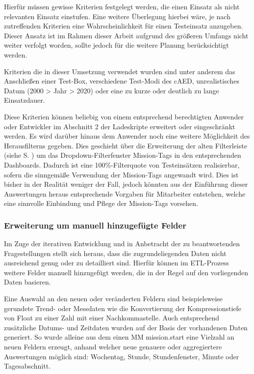 Hierfür müssen gewisse Kriterien festgelegt werden, die einen Einsatz als nicht relevanten Einsatz einstufen.
Eine weitere Überlegung hierbei wäre, je nach zutreffenden Kriterien eine Wahrscheinlichkeit für einen Testeinsatz anzugeben.
Dieser Ansatz ist im Rahmen dieser Arbeit aufgrund des größeren Umfangs nicht weiter verfolgt worden, sollte jedoch für die weitere Planung berücksichtigt werden.

Kriterien die in dieser Umsetzung verwendet wurden sind unter anderem das Anschließen einer Test-Box, verschiedene Test-Modi des \gls{cAED}, unrealistisches Datum (2000 > Jahr > 2020) oder eine zu kurze oder deutlich zu lange Einsatzdauer.

Diese Kriterien können beliebig von einem entsprechend berechtigten Anwender oder Entwickler im Abschnitt 2 der Ladeskripte erweitert oder eingeschränkt werden.
Es wird darüber hinaus dem Anwender noch eine weitere Möglichkeit des Herausfilterns gegeben.
Dies geschieht über die Erweiterung der alten Filterleiste (siehe S. \pageref{par:filter}) um das Dropdown-Filterfenster \glqq Mission-Tags\grqq{} in den entsprechenden Dashboards. %
Dadurch ist eine 100\%-Filterquote von Testeinsätzen realisierbar, sofern die sinngemäße Verwendung der Mission-Tags angewandt wird.
Dies ist bisher in der Realität weniger der Fall, jedoch könnten aus der Einführung dieser Auswertungen heraus entsprechende Vorgaben für Mitarbeiter entstehen, welche eine sinnvolle Einbindung und Pflege der Mission-Tags vorsehen.

\subsubsection{Erweiterung um manuell hinzugefügte Felder}
\label{subsub:weitereFelder}
Im Zuge der iterativen Entwicklung und in Anbetracht der zu beantwortenden Fragestellungen stellt sich heraus, dass die zugrundeliegenden Daten nicht ausreichend genug oder zu detailliert sind.
Hierfür können im \gls{ETL}-Prozess weitere Felder manuell hinzugefügt werden, die in der Regel auf den vorliegenden Daten basieren.

Eine Auswahl an den neuen oder veränderten Feldern sind beispielsweise gerundete Trend- oder Messdaten wie die Konvertierung der Kompressionstiefe von \glqq Float\grqq{} zu einer Zahl mit einer Nachkommastelle.
Auch entsprechend zusätzliche Datums- und Zeitdaten wurden auf der Basis der vorhandenen Daten generiert. 
So wurde alleine aus dem einen \gls{MM} \glqq mission.start\grqq{} eine Vielzahl an neuen Feldern erzeugt, anhand welcher neue genauere oder aggregiertere Auswertungen möglich sind: Wochentag, Stunde, Stundenfenster, Minute oder Tagesabschnitt.

